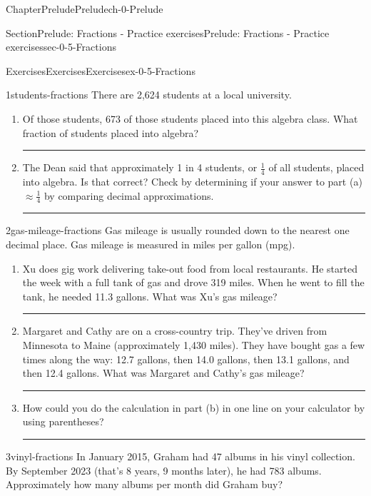 \documentclass[twoside,11pt,]{book}
\newlength{\workspacestrutwidth}
\numberwithin{equation}{section}
\begin{document}
\begin{chapterptx}{Chapter}{Prelude}{}{Prelude}{}{}{ch-0-Prelude}
\begin{sectionptx}{Section}{Prelude: Fractions - Practice exercises}{}{Prelude: Fractions - Practice exercises}{}{}{sec-0-5-Fractions}
\begin{exercises-subsection-numberless}{Exercises}{Exercises}{}{Exercises}{}{}{ex-0-5-Fractions}
\begin{divisionexercise}{1}{}{}{students-fractions}%
There are 2,624 students at a local university.%
\begin{enumerate}[label=(\alph*),ref=\alph*]%
\item{}Of those students, 673 of those students placed into this algebra class. What fraction of students placed into algebra?%
\par\rule{\workspacestrutwidth}{0.6in}%
\item{}The Dean said that approximately 1 in 4 students, or \(\frac{1}{4}\) of all students, placed into algebra. Is that correct? Check by determining if your answer to part (a) \(\approx \frac{1}{4}\) by comparing decimal approximations.%
\par\rule{\workspacestrutwidth}{0.6in}%
\end{enumerate}%
\end{divisionexercise}%
 \begin{divisionexercise}{2}{}{}{gas-mileage-fractions}%
Gas mileage is usually rounded down to the nearest one decimal place. Gas mileage is measured in miles per gallon (mpg).%
\begin{enumerate}[label=(\alph*),ref=\alph*]%
\item{}Xu does gig work delivering take-out food from local restaurants. He started the week with a full tank of gas and drove 319 miles. When he went to fill the tank, he needed 11.3 gallons. What was Xu's gas mileage?%
\par\rule{\workspacestrutwidth}{0.6in}%
\item{}Margaret and Cathy are on a cross-country trip. They've driven from Minnesota to Maine (approximately 1,430 miles). They have bought gas a few times along the way: 12.7 gallons, then 14.0 gallons, then 13.1 gallons, and then 12.4 gallons. What was Margaret and Cathy's gas mileage?%
\par\rule{\workspacestrutwidth}{0.6in}%
\item{}How could you do the calculation in part (b) in one line on your calculator by using parentheses?%
\par\rule{\workspacestrutwidth}{0.6in}%
\end{enumerate}%
\end{divisionexercise}%
\clearpage
\begin{divisionexercise}{3}{}{}{vinyl-fractions}%
In January 2015, Graham had 47 albums in his vinyl collection. By September 2023 (that's 8 years, 9 months later), he had 783 albums. Approximately how many albums per month did Graham buy?%

\end{divisionexercise}
\end{exercises-subsection-numberless}
\end{sectionptx}
\end{chapterptx}
\end{document}
